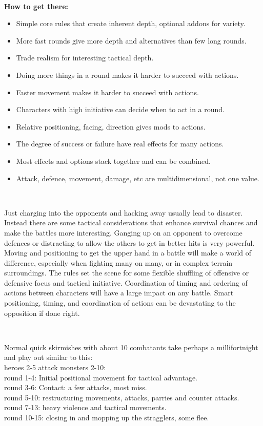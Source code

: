 \

\textbf{How to get there:}
\begin{itemize}
    \item Simple core rules that create inherent depth, optional addons for variety.
    \item More fast rounds give more depth and alternatives than few long rounds.
    \item Trade realism for interesting tactical depth.
    \item Doing more things in a round makes it harder to succeed with actions.
    \item Faster movement makes it harder to succeed with actions.
    \item Characters with high initiative can decide when to act in a round.
    \item Relative positioning, facing, direction gives mods to actions.
    \item The degree of success or failure have real effects for many actions.
    \item Most effects and options stack together and can be combined.
    \item Attack, defence, movement, damage, etc are multidimensional, not one value.
\end{itemize}

\

Just charging into the opponents and hacking away usually lead to disaster. Instead there are some tactical considerations that enhance survival chances and make the battles more interesting. Ganging up on an opponent to overcome defences or distracting to allow the others to get in better hits is very powerful. Moving and positioning to get the upper hand in a battle will make a world of difference, especially when fighting many on many, or in complex terrain surroundings. The rules set the scene for some flexible shuffling of offensive or defensive focus and tactical initiative. Coordination of timing and ordering of actions between characters will have a large impact on any battle. Smart positioning, timing, and coordination of actions can be devastating to the opposition if done right.

\

Normal quick skirmishes with about 10 combatants take perhaps a millifortnight and play out similar to this: \\
heroes 2-5 attack monsters 2-10: \\
round 1-4: Initial positional movement for tactical advantage. \\
round 3-6: Contact: a few attacks, most miss. \\
round 5-10: restructuring movements, attacks, parries and counter attacks. \\
round 7-13: heavy violence and tactical movements. \\
round 10-15: closing in and mopping up the stragglers, some flee.


